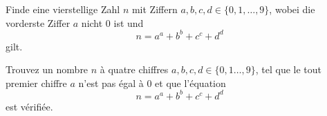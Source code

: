 Finde eine vierstellige Zahl $n$ mit Ziffern $a,b,c,d \in \{0, 1 , \ldots, 9 \}$, wobei die vorderste Ziffer $a$ nicht 0 ist und
\[
n= a^a + b^b + c^c + d^d
\]
gilt.

\bigskip

Trouvez un nombre $n$ à quatre chiffres $a,b,c,d \in \{0,1 \ldots , 9\}$, tel que le tout premier chiffre $a$ n'est pas égal à 0 et que l'équation
\[
n= a^a + b^b + c^c + d^d
\]
est vérifiée.